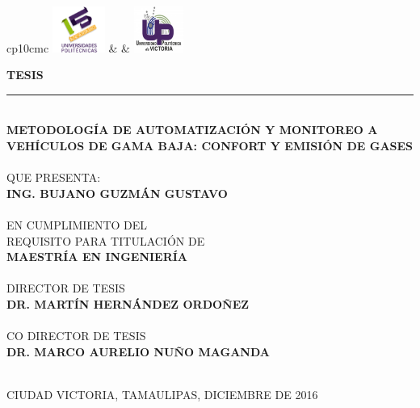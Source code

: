 \documentclass[12pt]{article}
\date{\specialdate\today}
\newcommand{\HRule}{\rule{\linewidth}{0.25mm}}
\newcommand{\nproyecto}           {Metodología de automatización y monitoreo a vehículos de gama baja: confort y emisión de gases}
\newcommand{\nalumno}             {ING. BUJANO GUZMÁN GUSTAVO}
\newcommand{\ncarrera}            {MAESTRÍA EN INGENIERÍA }
\newcommand{\nasesorinstitucional}{Dr. MARTÍN HERNÁNDEZ ORDOÑEZ}
\newcommand{\nasesorinstitucionaldos}{Dr. Marco Aurelio Nuño Maganda}
\newcommand{\fecha}               {Diciembre de 2016}
\newcommand{\separacionCorta}{0.0cm}
\newcommand{\separacionLarga}{0.5cm}
\newcommand{\iemph}[1]{\MakeTextUppercase{#1}}
\begin{document}
\setcounter{page}{1}
\thispagestyle{empty}

\begin{center}

\begin{tabular}{cp{10cm}c}
\includegraphics[height=1.5cm]{LogoPOLIS.png} & & \includegraphics[height=1.5cm]{LogoUPV.png}   \\
\end{tabular}

\Large \textbf{TESIS}
\HRule \\[\separacionLarga]
\textbf{\iemph{\nproyecto}} \\[\separacionLarga]
\textbf{ }\\[\separacionLarga]
QUE PRESENTA: \\[\separacionCorta]
\textbf{\iemph{\nalumno}}\\[\separacionLarga]
\textbf{ }\\[\separacionLarga]
EN CUMPLIMIENTO DEL  \\[\separacionCorta]
REQUISITO PARA TITULACIÓN DE \\[\separacionCorta]
\textbf{\iemph{\ncarrera}} \\[\separacionLarga]
\textbf{ }\\[\separacionLarga]
DIRECTOR DE TESIS \\[\separacionCorta]
\textbf{\iemph{\nasesorinstitucional}} \\[\separacionLarga]
\textbf{ }\\[\separacionLarga]
CO DIRECTOR DE TESIS \\[\separacionCorta]
\textbf{\iemph{\nasesorinstitucionaldos}} \\[\separacionLarga]

\textbf{ }\\[\separacionLarga]


\end{center}
\begin{flushright}
\iemph{Ciudad Victoria, Tamaulipas, \fecha}
\end{flushright}
\end{document}
